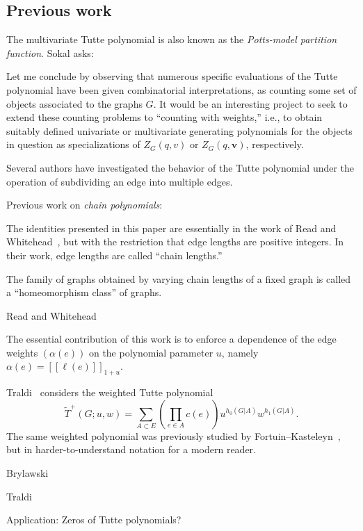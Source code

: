 \documentclass{amsart}
\theoremstyle{definition}
\newcommand{\fanalog}[2]{[\![#2]\!]_{#1}}
\begin{document}
\subsection{Previous work} 

The multivariate Tutte polynomial \cite{Sok-potts}
is also known as the {\em Potts-model partition function}.
Sokal \cite{Sok-potts} asks:
\begin{displayquote}
	Let me conclude by observing that numerous specific evaluations of the Tutte polynomial have been given combinatorial interpretations, 
	as counting some set of objects associated to the graphs $G$. 
	It would be an interesting project to seek to extend these counting problems to ``counting with weights,''
	i.e., to obtain suitably defined univariate or multivariate generating polynomials for the objects in question as specializations of 
	$Z_G(q,v)$ or $Z_G(q,\mathbf{v})$, respectively.
\end{displayquote}

Several authors have investigated the behavior of the Tutte polynomial under the operation of subdividing an edge into multiple edges.

Previous work on {\em chain polynomials}:

The identities presented in this paper are essentially in the work of Read and Whitehead~\cite{RW2}, but with the restriction that edge lengths are positive integers. In their work, edge lengths are called ``chain lengths.''

The family of graphs obtained by varying chain lengths of a fixed graph is called a ``homeomorphism class'' of graphs.

Read and Whitehead \cite{RW2}
\cites{RW1,RW2}

The essential contribution of this work is to enforce a dependence of the edge weights $(\alpha(e))$ on the polynomial parameter $u$, namely $\alpha(e) = \fanalog{1 + u}{\ell(e)}$.

Traldi~\cite{Tra1} considers the weighted Tutte polynomial
\[
	\widetilde T^+(G; u,w) = \sum_{A \subset E} \left( \prod_{e \in A} c(e) \right) u^{h_0(G|A)} w^{h_1(G|A)} .
\]
The same weighted polynomial was previously studied by Fortuin--Kasteleyn~\cite{FK}, but in harder-to-understand notation for a modern reader.


Brylawski \cite{Bry}

Traldi \cites{Tra1,Tra2,Tra3}

Application: Zeros of Tutte polynomials?
\end{document}
